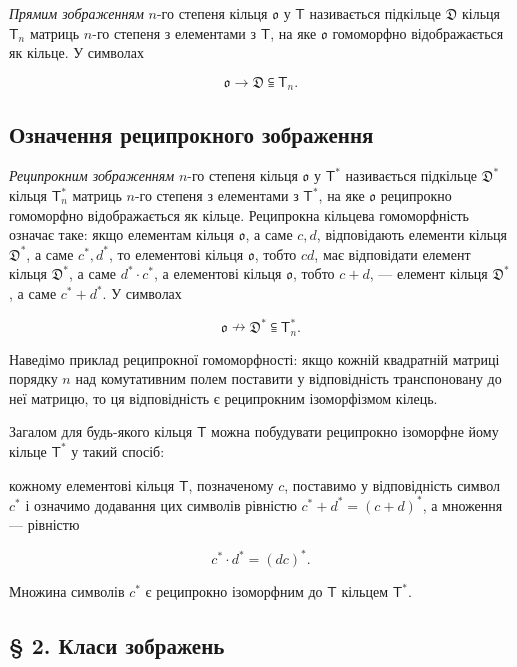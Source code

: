 \documentclass[11pt]{article}
\begin{document}
\emph{Прямим зображенням} \(n\)-го степеня кільця \(\mathfrak{o}\) у \(\mathsf T\) називається підкільце \(\mathfrak D\) кільця \(\mathsf T_n\) матриць \(n\)-го степеня з елементами з \(\mathsf T\), на яке \(\mathfrak{o}\) гомоморфно відображається як кільце. У символах

\[
\mathfrak{o}\to\mathfrak D\subseteqq\mathsf T_n.
\]

\subsection*{Означення реципрокного зображення}\label{definition-der-reziproken-darstellung}

\emph{Реципрокним зображенням} \(n\)-го степеня кільця \(\mathfrak{o}\) у \(\mathsf T^*\) називається підкільце \(\mathfrak D^*\) кільця \(\mathsf T_n^*\) матриць \(n\)-го степеня з елементами з \(\mathsf T^*\), на яке \(\mathfrak{o}\) реципрокно гомоморфно відображається як кільце. Реципрокна кільцева гомоморфність означає таке: якщо елементам кільця \(\mathfrak{o}\), а саме \(c,d\), відповідають елементи кільця \(\mathfrak D^*\), а саме \(c^*,d^*\), то елементові кільця \(\mathfrak{o}\), тобто \(cd\), має відповідати елемент кільця \(\mathfrak D^*\), а саме \(d^*\cdot c^*\), а елементові кільця \(\mathfrak{o}\), тобто \(c+d\), --- елемент кільця \(\mathfrak D^*\), а саме \(c^*+d^*\). У символах

\[
\mathfrak{o}\nrightarrow\mathfrak D^*\subseteqq\mathsf T_n^*.
\]

Наведімо приклад реципрокної гомоморфності: якщо кожній квадратній матриці порядку \(n\) над комутативним полем поставити у відповідність транспоновану до неї матрицю, то ця відповідність є реципрокним ізоморфізмом кілець.

Загалом для будь-якого кільця \(\mathsf T\) можна побудувати реципрокно ізоморфне йому кільце \(\mathsf T^*\) у такий спосіб:

кожному елементові кільця \(\mathsf T\), позначеному \(c\), поставимо у відповідність символ \(c^*\) і означимо додавання цих символів рівністю \(c^*+d^*=(c+d)^*\), а множення --- рівністю

\[
c^*\cdot d^*=(dc)^*.
\]

Множина символів \(c^*\) є реципрокно ізоморфним до \(\mathsf T\) кільцем \(\mathsf T^*\).

\subsection*{§ 2. Класи зображень}\label{darstellungsklassen}
\end{document}
